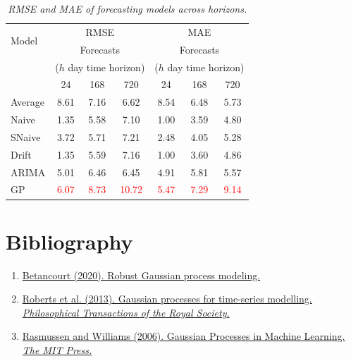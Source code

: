 \documentclass[a4paper, 10pt]{article}
\begin{document}
\begin{flushleft}
      \begin{table}[H]
         \centering
         \begin{tabular}{lcccccc}
         \hline
         \multirow{2}{*}{Model} & \multicolumn{3}{c}{RMSE} & \multicolumn{3}{c}{MAE} \\
         \cline{2-7}
         & \multicolumn{3}{c}{Forecasts} & \multicolumn{3}{c}{Forecasts} \\
         & \multicolumn{3}{c}{($h$ day time horizon)} & \multicolumn{3}{c}{($h$ day time horizon)} \\
         & 24 & 168 & 720 & 24 & 168 & 720 \\
         \hline
         Average & 8.61 & 7.16 & 6.62 & 8.54 & 6.48 & 5.73 \\
         Naive & 1.35 & 5.58 & 7.10 & 1.00 & 3.59 & 4.80 \\
         SNaive & 3.72 & 5.71 & 7.21 & 2.48 & 4.05 & 5.28 \\
         Drift & 1.35 & 5.59 & 7.16 & 1.00 & 3.60 & 4.86 \\
         ARIMA & 5.01 & 6.46 & 6.45 & 4.91 & 5.81 & 5.57 \\
         GP & \textcolor{red}{6.07} & \textcolor{red}{8.73} & \textcolor{red}{10.72} & \textcolor{red}{5.47} & \textcolor{red}{7.29} & \textcolor{red}{9.14} \\
         \hline
         \end{tabular}
         \caption{\textit{RMSE and MAE of forecasting models across horizons.}}
      \end{table}

   \section*{Bibliography}
      \begin{enumerate}
         \item \label{Betancourt2020} \href{https://betanalpha.github.io/assets/case_studies/gaussian_processes.html}{Betancourt (2020). Robust Gaussian process modeling.}
          \item \label{Roberts2013} \href{https://royalsocietypublishing.org/}{Roberts et al. (2013). Gaussian processes for time-series modelling. \textit{Philosophical Transactions of the Royal Society}.}
         \item \label{Rasmussen2006} \href{https://gaussianprocess.org/gpml/}{Rasmussen and Williams (2006). Gaussian Processes in Machine Learning. \textit{The MIT Press.}}
      \end{enumerate}
   
   \end{flushleft}
\end{document}
